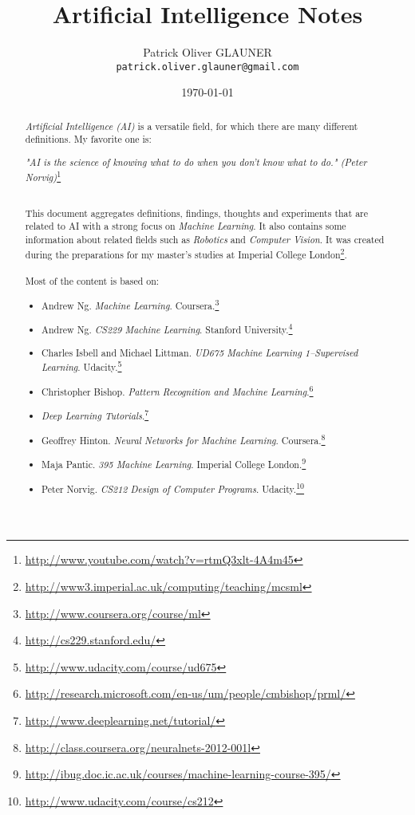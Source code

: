 \documentclass{report}
\title{Artificial Intelligence Notes}
\author{Patrick Oliver GLAUNER \\
	\texttt{patrick.oliver.glauner@gmail.com}}
\date{\today}
\begin{document}
\maketitle

\tableofcontents

\begin{abstract}
{\em Artificial Intelligence (AI)} is a versatile field, for which there are many different definitions. My favorite one is:
\begin{flushright}
{\em "AI is the science of knowing what to do when you don't know what to do." (Peter Norvig)}\footnote{\url{http://www.youtube.com/watch?v=rtmQ3xlt-4A4m45}}
\end{flushright}
~\\
This document aggregates definitions, findings, thoughts and experiments that are related to AI with a strong focus on {\em Machine Learning}. It also contains some information about related fields such as {\em Robotics} and {\em Computer Vision}.
It was created during the preparations for my master's studies at Imperial College London\footnote{\url{http://www3.imperial.ac.uk/computing/teaching/mcsml}}.
~\\~\\
Most of the content is based on:
\begin{itemize}
\item Andrew Ng. {\em Machine Learning}. Coursera.\footnote{\url{http://www.coursera.org/course/ml}}
\item Andrew Ng. {\em CS229 Machine Learning}. Stanford University.\footnote{\url{http://cs229.stanford.edu/}}
\item Charles Isbell and Michael Littman. {\em UD675 Machine Learning 1--Supervised Learning}. Udacity.\footnote{\url{http://www.udacity.com/course/ud675}}
\item Christopher Bishop. {\em Pattern Recognition and Machine Learning}.\footnote{\url{http://research.microsoft.com/en-us/um/people/cmbishop/prml/}}
\item {\em Deep Learning Tutorials}.\footnote{\url{http://www.deeplearning.net/tutorial/}}
\item Geoffrey Hinton. {\em Neural Networks for Machine Learning}. Coursera.\footnote{\url{http://class.coursera.org/neuralnets-2012-001l}}
\item Maja Pantic. {\em 395 Machine Learning}. Imperial College London.\footnote{\url{http://ibug.doc.ic.ac.uk/courses/machine-learning-course-395/}}
\item Peter Norvig. {\em CS212 Design of Computer Programs}. Udacity.\footnote{\url{http://www.udacity.com/course/cs212}}

\end{itemize}
\end{abstract}
\end{document}
